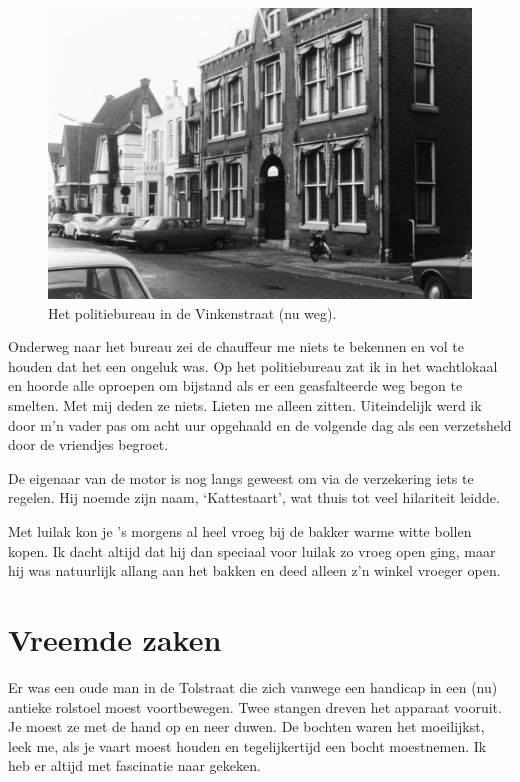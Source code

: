 \documentclass[12pt,twoside]{memoir}
\begin{document}
\begin{figure}
\includegraphics[width=\textwidth]{img/ch9/politburo}
\caption*{\footnotesize Het politiebureau in de Vinkenstraat (nu weg).}
\end{figure}

Onderweg naar het bureau zei de chauffeur me niets te bekennen en vol te houden dat het een ongeluk was. Op het politiebureau zat ik in het wachtlokaal en hoorde alle oproepen om bijstand als er een geasfalteerde weg begon te smelten. Met mij deden ze niets. Lieten me alleen zitten. Uiteindelijk werd ik door m’n vader pas om acht uur opgehaald en de volgende dag als een verzetsheld door de vriendjes begroet. 

De eigenaar van de motor is nog langs geweest om via de verzekering iets te regelen. Hij noemde zijn naam, `Kattestaart', wat thuis tot veel hilariteit leidde.

Met luilak kon je ’s morgens al heel vroeg bij de bakker warme witte bollen kopen. Ik dacht altijd dat hij dan speciaal voor luilak zo vroeg open ging, maar hij was natuurlijk allang aan het bakken en deed alleen z’n winkel vroeger open. 

\chapter{Vreemde zaken} %
\label{cha:vreemde_zaken}

Er was een oude man in de Tolstraat die zich vanwege een handicap in een (nu) antieke rolstoel moest voortbewegen. Twee stangen dreven het apparaat vooruit. Je moest ze met de hand op en neer duwen. De bochten waren het moeilijkst, leek me, als je vaart moest houden en tegelijkertijd een bocht moestnemen. Ik heb er altijd met fascinatie naar gekeken. 
\end{document}
